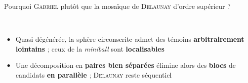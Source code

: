 \begin{frame}{Pourquoi \textsc{Gabriel} plutôt que la mosaïque de \textsc{Delaunay} d'ordre supérieur ?}
    \vspace{-0.10cm}
    \begin{center}
        \resizebox{0.50\textwidth}{!}{}\\[6pt]
        \begin{minipage}{0.50\textwidth}\small
        \end{minipage}
    \end{center}

    \vspace{0.22cm}
    \small
    \begin{itemize}
        \setlength{\itemsep}{6pt}
        \item Quasi dégénérée, la sphère circonscrite admet des témoins \textbf{arbitrairement lointains} ;
        ceux de la \emph{miniball} sont \textbf{localisables}
        \item Une décomposition en \textbf{paires bien séparées}  élimine alors des
        \textbf{blocs} de candidats \textbf{en parallèle} ; \textsc{Delaunay} reste séquentiel
    \end{itemize}
\end{frame}

